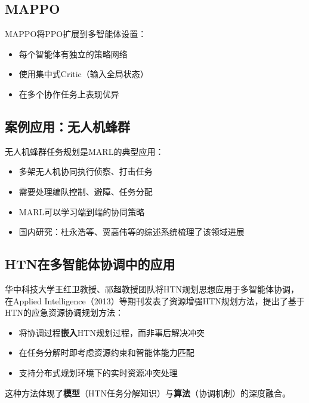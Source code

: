 \subsection{MAPPO}

MAPPO将PPO扩展到多智能体设置：
\begin{itemize}[leftmargin=2em]
  \item 每个智能体有独立的策略网络
  \item 使用集中式Critic（输入全局状态）
  \item 在多个协作任务上表现优异
\end{itemize}

\subsection{案例应用：无人机蜂群}

\begin{appbox}[应用：无人机蜂群协同]
无人机蜂群任务规划是MARL的典型应用：
\begin{itemize}
  \item 多架无人机协同执行侦察、打击任务
  \item 需要处理编队控制、避障、任务分配
  \item MARL可以学习端到端的协同策略
  \item 国内研究：杜永浩等、贾高伟等的综述系统梳理了该领域进展
\end{itemize}
\end{appbox}

\subsection{HTN在多智能体协调中的应用}

华中科技大学王红卫教授、祁超教授团队将HTN规划思想应用于多智能体协调，在Applied Intelligence（2013）等期刊发表了资源增强HTN规划方法，提出了基于HTN的应急资源协调规划方法：

\begin{keypoint}[HTN协调规划的核心思想]
\begin{itemize}
  \item 将协调过程\textbf{嵌入}HTN规划过程，而非事后解决冲突
  \item 在任务分解时即考虑资源约束和智能体能力匹配
  \item 支持分布式规划环境下的实时资源冲突处理
\end{itemize}
这种方法体现了\textbf{模型}（HTN任务分解知识）与\textbf{算法}（协调机制）的深度融合。
\end{keypoint}

